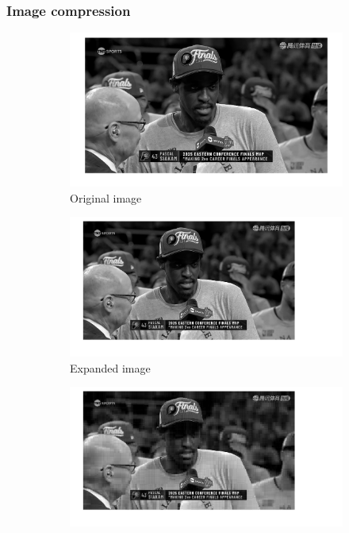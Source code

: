 \documentclass{beamer} %
\begin{document}
\begin{frame}
	\frametitle{Image compression}
	\begin{figure}[ht]
		\centering
		\begin{subfigure}[b]{0.45\textwidth}
			\includegraphics[width=\textwidth]{fig/Siakam_gray.png}
			\caption{Original image}
			\label{fig:20250803Siakam}
		\end{subfigure}
		\hfill %
		\begin{subfigure}[b]{0.45\textwidth}
			\includegraphics[width=\textwidth]{fig/Siakam_expanded.png}
			\caption{Expanded image}
			\label{fig:20250803Siakam_expanded}
		\end{subfigure}
		\begin{subfigure}[b]{0.45\textwidth}
			\includegraphics[width=\textwidth]{fig/Siakam_expanded_compressed.png}

\end{subfigure}
\end{figure}
\end{frame}
\end{document}
